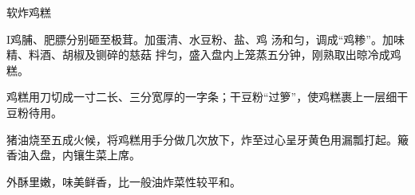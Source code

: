 \begin{recipe}{软炸鸡糕}

\ingredients



\cooking

I鸡脯、肥膘分别砸至极茸。加蛋清、水豆粉、盐、鸡 汤和匀，调成“鸡糁”。加味精、料酒、胡椒及铡碎的慈菇 拌匀，盛入盘内上笼蒸五分钟，刚熟取出晾冷成鸡糕。

\step 鸡糕用刀切成一寸二长、三分宽厚的一字条；干豆粉“过箩”，使鸡糕裹上一层细干豆粉待用。

\step 猪油烧至五成火候，将鸡糕用手分做几次放下，炸至过心呈牙黄色用漏瓢打起。簸香油入盘，内镶生菜上席。

\notes

外酥里嫩，味美鲜香，比一般油炸菜性较平和。

\end{recipe}

